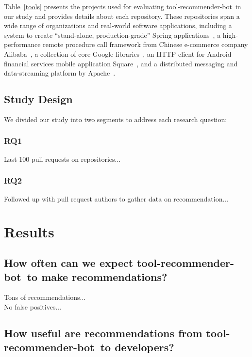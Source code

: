 \documentclass[conference]{IEEEtran}
\newcommand{\tool}{tool-recommender-bot}
\begin{document}
Table~\ref{tools} presents the projects used for evaluating \tool~in our study and provides details about each repository. These repositories span a wide range of organizations and real-world software applications, including a system to create ``stand-alone, production-grade'' Spring applications~\cite{spring-boot}, a high-performance remote procedure call framework from Chinese e-commerce company Alibaba~\cite{dubbo}, a collection of core Google libraries~\cite{guava}, an HTTP client for Android financial services mobile application Square~\cite{square-retrofit}, and a distributed messaging and data-streaming platform by Apache~\cite{rocketmq}.

\subsection{Study Design}

We divided our study into two segments to address each research question:

\subsubsection{RQ1}

Last 100 pull requests on repositories...

\subsubsection{RQ2}

Followed up with pull request authors to gather data on recommendation...

\section{Results}

\subsection{How often can we expect \tool~to make recommendations?}

Tons of recommendations... \\

No false positives... \\

\subsection{How useful are recommendations from \tool~to developers?}
\end{document}
